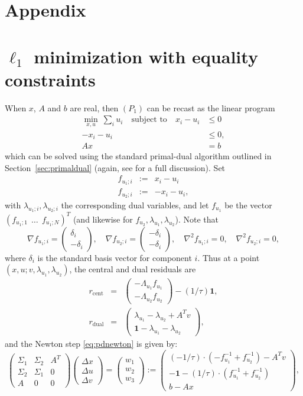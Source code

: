 \documentclass{article}
\newcommand{\bpm}{\left(\begin{matrix}}
\newcommand{\epm}{\end{matrix}\right)}
\newcommand{\grad}{\nabla}
\newcommand{\dx}{\Delta x}
\newcommand{\du}{\Delta u}
\newcommand{\dv}{\Delta v}
\newcommand{\<}{\langle}
\renewcommand{\>}{\rangle}
\begin{document}
\newpage
\section*{Appendix}
\appendix

\section{$\ell_1$ minimization with equality constraints}

When $x$, $A$ and $b$ are real, then $(P_1)$ can be recast as the linear program
\begin{align*}
\min_{x,u}~\sum_i u_i \quad\text{subject~to}\quad
 x_i - u_i  & \leq 0 \\[-4mm]
 -x_i - u_i & \leq 0, \\
 Ax & = b
\end{align*}
which can be solved using the standard primal-dual algorithm outlined in Section~\ref{sec:primaldual}
(again, see \cite[Chap.11]{boyd04co} for a full discussion).
Set
\begin{eqnarray*}
f_{u_1;i} & := & x_i - u_i \\
f_{u_2;i} & := & -x_i - u_i,
\end{eqnarray*}
with $\lambda_{u_1;i},\lambda_{u_2;i}$ the corresponding dual variables, 
and let $f_{u_1}$ be the vector $(f_{u_1;1}~~\ldots~~f_{u_1;N})^T$ (and likewise for $f_{u_2},\lambda_{u_1},\lambda_{u_2}$).
Note that
\[
\grad f_{u_1;i} = \bpm \delta_i \\ -\delta_i \epm,
\quad
\grad f_{u_2;i} = \bpm -\delta_i \\ -\delta_i \epm,
\quad
\grad^2 f_{u_1;i} = 0,
\quad
\grad^2 f_{u_2;i} = 0,
\]
where $\delta_i$ is the standard basis vector for component $i$.  
Thus at a point $(x,u; v,\lambda_{u_1},\lambda_{u_2})$, the central and dual 
residuals are 
\begin{eqnarray*}
r_{\mathrm{cent}} & = & \bpm -\Lambda_{u_1} f_{u_1} \\ -\Lambda_{u_2} f_{u_2} \epm 
- (1/\tau)\mathbf{1}, \\
r_{\mathrm{dual}} & = & \bpm \lambda_{u_1}-\lambda_{u_2} + A^Tv \\ 
\mathbf{1} - \lambda_{u_1}-\lambda_{u_2} \epm,
\end{eqnarray*}
and the Newton step 
\eqref{eq:pdnewton} is given by:
\[
\bpm \Sigma_1 & \Sigma_2 & A^T \\ \Sigma_2 & \Sigma_1 & 0 \\ A & 0 & 0 \epm
\bpm \dx \\ \du \\ \dv \epm =
\bpm w_1 \\ w_2 \\ w_3 \epm :=
\bpm (-1/\tau)\cdot(-f^{-1}_{u_1} + f^{-1}_{u_2}) - A^Tv \\
-\mathbf{1} - (1/\tau)\cdot(f^{-1}_{u_1} + f^{-1}_{u_2}) \\
b - Ax \epm,
\]
\end{document}
